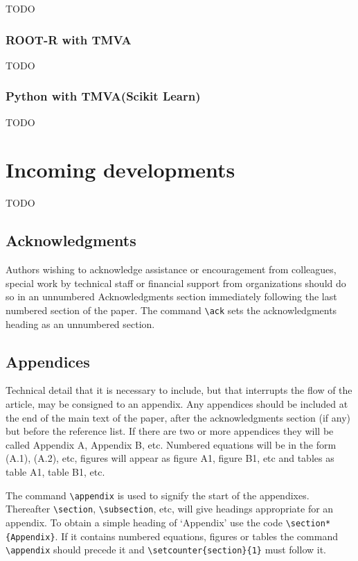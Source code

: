 \documentclass[a4paper]{jpconf}
\begin{document}
TODO

\subsubsection{ROOT-R with TMVA}

TODO

\subsubsection{Python with TMVA(Scikit Learn)}

TODO

\section{Incoming developments} 

TODO


\subsection{Acknowledgments}
Authors wishing to acknowledge assistance or encouragement from 
colleagues, special work by technical staff or financial support from 
organizations should do so in an unnumbered Acknowledgments section 
immediately following the last numbered section of the paper. The 
command \verb"\ack" sets the acknowledgments heading as an unnumbered
section.

\subsection{Appendices}
Technical detail that it is necessary to include, but that interrupts 
the flow of the article, may be consigned to an appendix. 
Any appendices should be included at the end of the main text of the paper, after the acknowledgments section (if any) but before the reference list.
If there are two or more appendices they will be called Appendix A, Appendix B, etc. 
Numbered equations will be in the form (A.1), (A.2), etc,
figures will appear as figure A1, figure B1, etc and tables as table A1,
table B1, etc.

The command \verb"\appendix" is used to signify the start of the
appendixes. Thereafter \verb"\section", \verb"\subsection", etc, will 
give headings appropriate for an appendix. To obtain a simple heading of 
`Appendix' use the code \verb"\section*{Appendix}". If it contains
numbered equations, figures or tables the command \verb"\appendix" should
precede it and \verb"\setcounter{section}{1}" must follow it. 
\end{document}
